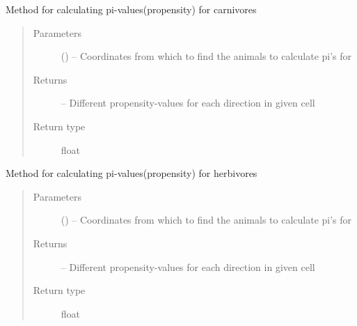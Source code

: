 \documentclass[a4paper,10pt,english]{sphinxmanual}
\begin{document}
\begin{fulllineitems}
\begin{fulllineitems}
\end{fulllineitems}


\begin{fulllineitems}
\label{\detokenize{island:biosim.island.Island.get_pi_values_carnivores}}
Method for calculating pi-values(propensity) for carnivores
\begin{quote}\begin{description}
\item[{Parameters}] \leavevmode
{} () -- Coordinates  from which to find the animals to calculate pi's for

\item[{Returns}] \leavevmode
{} -- Different propensity-values for each direction in given cell

\item[{Return type}] \leavevmode
float

\end{description}\end{quote}

\end{fulllineitems}


\begin{fulllineitems}
\label{\detokenize{island:biosim.island.Island.get_pi_values_herbivores}}
Method for calculating pi-values(propensity) for herbivores
\begin{quote}\begin{description}
\item[{Parameters}] \leavevmode
{} () -- Coordinates  from which to find the animals to calculate pi's for

\item[{Returns}] \leavevmode
{} -- Different propensity-values for each direction in given cell

\item[{Return type}] \leavevmode
float


\end{description}
\end{quote}
\end{fulllineitems}
\end{fulllineitems}
\end{document}
